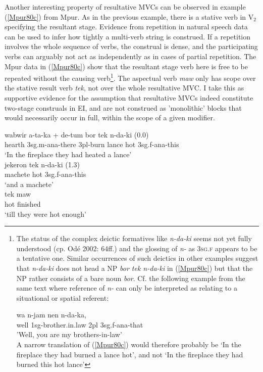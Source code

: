 Another interesting property of resultative MVCs can be observed in example (\ref{Mpur80c}) from Mpur. As in the previous example, there is a stative verb in V$_2$ specifying the resultant stage. Evidence from repetition in natural speech data can be used to infer how tightly a multi-verb string is construed. If a repetition involves the whole sequence of verbs, the construal is dense, and the participating verbs can arguably not act as independently as in cases of partial repetition. The Mpur data in (\ref{Mpur80c}) show that the resultant stage verb here is free to be repeated without the causing verb\footnote{The status of the complex deictic formatives like \textit{n-da-ki} seems not yet fully understood (cp. Odé 2002: 64ff.) and the glossing of \textit{n-} as \textsc{3sg.f} appears to be a tentative one. Similar occurrences of such deictics in other examples suggest that \textit{n-da-ki} does not head a NP \textit{bor tek n-da-ki} in (\ref{Mpur80c}) but that the NP rather consists of a bare noun \textit{bor}. Cf. the following example from the same text where reference of \textit{n-} can only be interpreted as relating to a situational or spatial referent:

\ea \label{Mpur_p105}
\gll wa n-jam nen n-da-ka, \\
well \acs{1}\acs{sg}-brother.in.law \acs{2}\acs{pl} \acs{3}\acs{sg}.\acs{f}-\acs{ana}-that \\
\glft 'Well, you are my brothers-in-law' \\ 
\z
\xe
A narrow translation of (\ref{Mpur80c}) would therefore probably be `In the fireplace they had burned a lance hot', and not `In the fireplace they had burned this hot lance'}. The aspectual verb \textit{maw} only has scope over the stative result verb \textit{tek}, not over the whole resultative MVC. I take this as supportive evidence for the assumption that resultative MVCs indeed constitute two-stage construals in EI, and are not construed as 'monolithic' blocks that would necessarily occur in full, within the scope of a given modifier.

\pex[glhangstyle=none] \label{Mpur80c}
\a
\gll wabwir a-ta-ka + de-tum bor tek n-da-ki (0.0) \\
hearth \acs{3}\acs{sg}.\acs{m}-\acs{ana}-there \acs{3}\acs{pl}-burn lance hot \acs{3}\acs{sg}.\acs{f}-\acs{ana}-this \\
\glft `In the fireplace they had heated a lance' \\ 
\z
\a
\gll jekeron tek n-da-ki (1.3) \\ 
machete hot \acs{3}\acs{sg}.\acs{f}-\acs{ana}-this \\
\glft `and a machete' \\ 
\z
\a
\gll tek maw \\ 
hot finished \\
\glft `till they were hot enough' \\ 
\z
\xe

